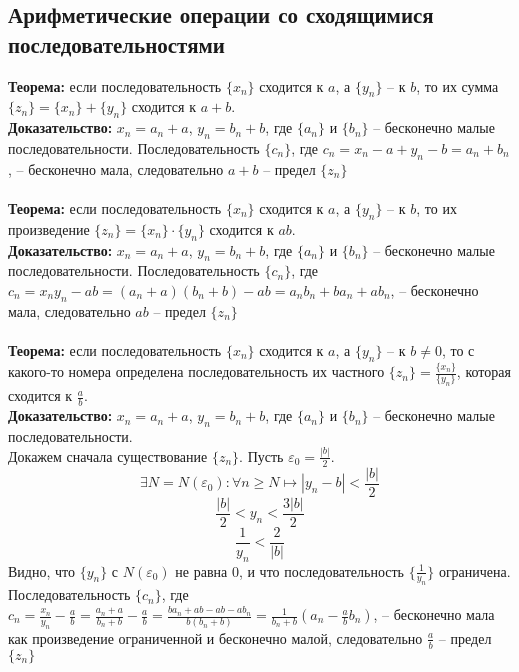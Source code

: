 \documentclass{article}
\begin{document}
    \subsection*{Арифметические операции со сходящимися последовательностями}
        \textbf{Теорема:} если последовательность $\{x_n\}$ сходится к $a$, а $\{y_n\}$ -- к $b$, то их сумма $\{z_n\} = \{x_n\} + \{y_n\}$ сходится к $a + b$.
        \\
        \textbf{Доказательство:}
        $x_n = a_n + a$, $y_n = b_n + b$, где $\{a_n\}$ и $\{b_n\}$ -- бесконечно малые последовательности.
        Последовательность $\{c_n\}$, где $c_n = x_n - a + y_n - b = a_n + b_n$, -- бесконечно мала, следовательно
        $a + b$ -- предел $\{z_n\}$
        \\
        \\
        \textbf{Теорема:} если последовательность $\{x_n\}$ сходится к $a$, а $\{y_n\}$ -- к $b$, то их произведение $\{z_n\} = \{x_n\} \cdot \{y_n\}$ сходится к $ab$.
        \\
        \textbf{Доказательство:}
        $x_n = a_n + a$, $y_n = b_n + b$, где $\{a_n\}$ и $\{b_n\}$ -- бесконечно малые последовательности.
        Последовательность $\{c_n\}$, где $c_n = x_n y_n - ab = (a_n + a) (b_n + b) - ab = a_n b_n + b a_n + a b_n $, -- бесконечно мала, следовательно
        $ab$ -- предел $\{z_n\}$
        \\
        \\
        \textbf{Теорема:} если последовательность $\{x_n\}$ сходится к $a$, а $\{y_n\}$ -- к $b \neq 0$, то с какого-то номера
        определена последовательность их частного $\{z_n\} = \frac{\{x_n\}}{\{y_n\}}$, которая сходится к $\frac{a}{b}$.    
        \\
        \textbf{Доказательство:}
        $x_n = a_n + a$, $y_n = b_n + b$, где $\{a_n\}$ и $\{b_n\}$ -- бесконечно малые последовательности.
        \\
        Докажем сначала существование $\{z_n\}$. Пусть $\varepsilon_0 = \frac{|b|}{2}$.
        \[ \exists N = N(\varepsilon_0): \forall n \ge N \longmapsto |y_n - b| < \frac{|b|}{2} \]
        \[ \frac{|b|}{2} < y_n < \frac{3|b|}{2} \]
        \[ \frac{1}{y_n} < \frac{2}{|b|} \]
        Видно, что $\{y_n\}$ с $N(\varepsilon_0)$ не равна $0$, и что последовательность $\{\frac{1}{y_n}\}$ ограничена.
        \\
        Последовательность $\{c_n\}$, где $c_n = \frac{x_n}{y_n} - \frac{a}{b} = \frac{a_n + a}{b_n + b} - \frac{a}{b} =
        \frac{b a_n + ab - ab - a b_n}{b(b_n + b)} = \frac{1}{b_n + b}(a_n - \frac{a}{b} b_n)$, -- бесконечно мала как произведение ограниченной
        и бесконечно малой, следовательно $\frac{a}{b}$ -- предел $\{z_n\}$
    
\end{document}
